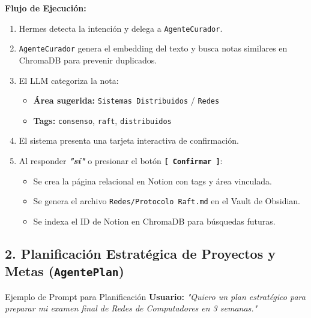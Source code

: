 \documentclass[11pt,a4paper]{article}
\begin{document}
\textbf{Flujo de Ejecución:}
\begin{enumerate}
    \item Hermes detecta la intención y delega a \texttt{AgenteCurador}.
    \item \texttt{AgenteCurador} genera el embedding del texto y busca notas similares en ChromaDB para prevenir duplicados.
    \item El LLM categoriza la nota:
    \begin{itemize}
        \item \textbf{Área sugerida:} \texttt{Sistemas Distribuidos} / \texttt{Redes}
        \item \textbf{Tags:} \texttt{consenso}, \texttt{raft}, \texttt{distribuidos}
    \end{itemize}
    \item El sistema presenta una tarjeta interactiva de confirmación.
    \item Al responder \textbf{\textit{"sí"}} o presionar el botón \textbf{\texttt{[ Confirmar ]}}:
    \begin{itemize}
        \item Se crea la página relacional en Notion con tags y área vinculada.
        \item Se genera el archivo \texttt{Redes/Protocolo Raft.md} en el Vault de Obsidian.
        \item Se indexa el ID de Notion en ChromaDB para búsquedas futuras.
    \end{itemize}
\end{enumerate}

\subsection{2. Planificación Estratégica de Proyectos y Metas (\texttt{AgentePlan})}

\begin{infobox}{Ejemplo de Prompt para Planificación}
\textbf{Usuario:} \textit{"Quiero un plan estratégico para preparar mi examen final de Redes de Computadores en 3 semanas."}
\end{infobox}
\end{document}
